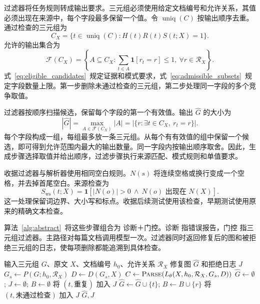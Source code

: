 过滤器将任务规则转成输出要求。三元组必须使用给定文档编号和允许关系，其值必须出现在来源中，每个字段最多保留一个值。令 $\operatorname{uniq}(C)$ 按输出顺序去重。通过检查的三元组为
\begin{equation}
    \label{eq:eligible_candidates}
    C_X=\{t\in\operatorname{uniq}(C):H(t)R(t)S(t;X)=1\}.
\end{equation}
允许的输出集合为
\begin{equation}
    \label{eq:admissible_subsets}
    \mathcal F(C_X)=\left\{A\subseteq C_X:
    \sum_{t\in A}\mathbf1[r_t=r]\leq1,\ \forall r\in\mathcal R_X\right\}.
\end{equation}
式~\ref{eq:eligible_candidates}~规定证据和模式要求，式~\ref{eq:admissible_subsets}~规定字段数量上限。第一步删除未通过检查的三元组，第二步处理同一字段的多个竞争取值。

过滤器按顺序扫描候选，保留每个字段的第一个有效值。输出 $\widehat G$ 的大小为
\begin{equation}
    \label{eq:selection_size}
    |\widehat G|=\max_{A\in\mathcal F(C_X)}|A|
    =|\{r:\exists t\in C_X,\ r_t=r\}|.
\end{equation}
每个字段构成一组，每组最多放一条三元组。从每个有有效值的组中保留一个候选，即可得到允许范围内最大的输出数量。同一字段内按输出顺序取舍。因此，生成步骤选择取值并给出顺序，过滤步骤执行来源匹配、模式规则和单值要求。

收据过滤器与解析器使用相同空白规则。$N(s)$ 将连续空格或换行变成一个空格，并去掉首尾空白。来源检查为
\begin{equation}
    S_{\mathrm{ws}}(t;X)=\mathbf1[|N(o)|>0\ \wedge\
    N(o)\text{ 出现在 }N(X)].
\end{equation}
这一处理保留词边界、大小写和标点。收据后续测试使用该检查，早期测试使用原来的精确文本检查。

算法~\ref{alg:abstract}~将这些步骤组合为 诊断＋门控。诊断 指错误报告，门控 指三元组过滤器。主路径对每篇文档调用模型一次。过滤器同时返回修复后的图和被拒绝三元组的日志，使每项删除都能追溯到具体检查。

\begin{algorithm}[t]
\caption{利用源文本和字段检查进行修复}
\label{alg:abstract}
\begin{algorithmic}[1]
\Require 输入三元组 $G$、原文 $X$、文档编号 $h_0$、允许关系 $\mathcal R_X$
\Ensure 修复图 $\widehat G$ 和拒绝日志 $J$
\State $G_s\gets P(G;h_0,\mathcal R_X)$
\State $D\gets D(G_s,X)$
\State $C\gets\textsc{Parse}(L_\theta(X,h_0,\mathcal R_X,G_s,D))$
\State $\widehat G\gets\emptyset$; $J\gets\emptyset$; $B\gets\emptyset$
\For{按生成顺序遍历候选 $t=(h,r,o)$}
        \State 将 $(t,\text{重复})$ 加入 $J$
        \State $\widehat G\gets\widehat G\cup\{t\}$; $B\gets B\cup\{r\}$
    \Else
        \State 将 $(t,\text{未通过检查})$ 加入 $J$
    \EndIf
\EndFor
\State \Return $\widehat G,J$
\end{algorithmic}
\end{algorithm}

